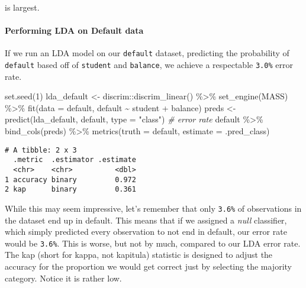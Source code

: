 \documentclass[
]{article}
\newenvironment{Shaded}{\begin{snugshade}}{\end{snugshade}}
\newcommand{\AttributeTok}[1]{\textcolor[rgb]{0.77,0.63,0.00}{#1}}
\newcommand{\CommentTok}[1]{\textcolor[rgb]{0.56,0.35,0.01}{\textit{#1}}}
\newcommand{\DecValTok}[1]{\textcolor[rgb]{0.00,0.00,0.81}{#1}}
\newcommand{\FunctionTok}[1]{\textcolor[rgb]{0.00,0.00,0.00}{#1}}
\newcommand{\NormalTok}[1]{#1}
\newcommand{\OtherTok}[1]{\textcolor[rgb]{0.56,0.35,0.01}{#1}}
\newcommand{\SpecialCharTok}[1]{\textcolor[rgb]{0.00,0.00,0.00}{#1}}
\newcommand{\StringTok}[1]{\textcolor[rgb]{0.31,0.60,0.02}{#1}}
\begin{document}
is largest.

\hypertarget{performing-lda-on-default-data}{%
\paragraph{Performing LDA on Default
data}\label{performing-lda-on-default-data}}

If we run an LDA model on our \texttt{default} dataset, predicting the
probability of \texttt{default} based off of \texttt{student} and
\texttt{balance}, we achieve a respectable \texttt{3.0\%} error rate.

\begin{Shaded}
\begin{Highlighting}[]
\FunctionTok{set.seed}\NormalTok{(}\DecValTok{1}\NormalTok{)}
\NormalTok{lda\_default }\OtherTok{\textless{}{-}}\NormalTok{ discrim}\SpecialCharTok{::}\FunctionTok{discrim\_linear}\NormalTok{() }\SpecialCharTok{\%\textgreater{}\%}
  \FunctionTok{set\_engine}\NormalTok{(}\StringTok{\textquotesingle{}MASS\textquotesingle{}}\NormalTok{) }\SpecialCharTok{\%\textgreater{}\%}
  \FunctionTok{fit}\NormalTok{(}\AttributeTok{data =}\NormalTok{ default, default }\SpecialCharTok{\textasciitilde{}}\NormalTok{ student }\SpecialCharTok{+}\NormalTok{ balance)}
\NormalTok{preds }\OtherTok{\textless{}{-}} \FunctionTok{predict}\NormalTok{(lda\_default, default, }\AttributeTok{type =} \StringTok{"class"}\NormalTok{)}
\CommentTok{\# error rate}
\NormalTok{default }\SpecialCharTok{\%\textgreater{}\%}
  \FunctionTok{bind\_cols}\NormalTok{(preds) }\SpecialCharTok{\%\textgreater{}\%}
  \FunctionTok{metrics}\NormalTok{(}\AttributeTok{truth =}\NormalTok{ default, }\AttributeTok{estimate =}\NormalTok{ .pred\_class)}
\end{Highlighting}
\end{Shaded}

\begin{verbatim}
# A tibble: 2 x 3
  .metric  .estimator .estimate
  <chr>    <chr>          <dbl>
1 accuracy binary         0.972
2 kap      binary         0.361
\end{verbatim}

While this may seem impressive, let's remember that only \texttt{3.6\%}
of observations in the dataset end up in default. This means that if we
assigned a \emph{null} classifier, which simply predicted every
observation to not end in default, our error rate would be
\texttt{3.6\%}. This is worse, but not by much, compared to our LDA
error rate. The kap (short for kappa, not kapitula) statistic is
designed to adjust the accuracy for the proportion we would get correct
just by selecting the majority category. Notice it is rather low.
\end{document}
